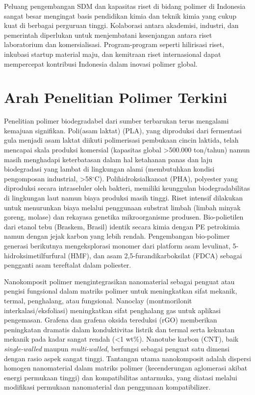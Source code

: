 \documentclass[12pt,a4paper,openany]{book}
\begin{document}
Peluang pengembangan SDM dan kapasitas riset di bidang polimer di Indonesia sangat besar mengingat basis pendidikan kimia dan teknik kimia yang cukup kuat di berbagai perguruan tinggi. Kolaborasi antara akademisi, industri, dan pemerintah diperlukan untuk menjembatani kesenjangan antara riset laboratorium dan komersialisasi. Program-program seperti hilirisasi riset, inkubasi startup material maju, dan kemitraan riset internasional dapat mempercepat kontribusi Indonesia dalam inovasi polimer global.

\section{Arah Penelitian Polimer Terkini}

Penelitian polimer biodegradabel dari sumber terbarukan terus mengalami kemajuan signifikan. Poli(asam laktat) (PLA), yang diproduksi dari fermentasi gula menjadi asam laktat diikuti polimerisasi pembukaan cincin laktida, telah mencapai skala produksi komersial (kapasitas global >500.000 ton/tahun) namun masih menghadapi keterbatasan dalam hal ketahanan panas dan laju biodegradasi yang lambat di lingkungan alami (membutuhkan kondisi pengomposan industrial, >58$^{\circ}$C). Polihidroksialkanoat (PHA), polyester yang diproduksi secara intraseluler oleh bakteri, memiliki keunggulan biodegradabilitas di lingkungan laut namun biaya produksi masih tinggi. Riset intensif dilakukan untuk menurunkan biaya melalui penggunaan substrat limbah (limbah minyak goreng, molase) dan rekayasa genetika mikroorganisme produsen. Bio-polietilen dari etanol tebu (Braskem, Brasil) identik secara kimia dengan PE petrokimia namun dengan jejak karbon yang lebih rendah. Pengembangan bio-polimer generasi berikutnya mengeksplorasi monomer dari platform asam levulinat, 5-hidroksimetilfurfural (HMF), dan asam 2,5-furandikarboksilat (FDCA) sebagai pengganti asam tereftalat dalam poliester.

Nanokomposit polimer mengintegrasikan nanomaterial sebagai penguat atau pengisi fungsional dalam matriks polimer untuk meningkatkan sifat mekanik, termal, penghalang, atau fungsional. Nanoclay (montmorilonit interkalasi/eksfoliasi) meningkatkan sifat penghalang gas untuk aplikasi pengemasan. Grafena dan grafena oksida tereduksi (rGO) memberikan peningkatan dramatis dalam konduktivitas listrik dan termal serta kekuatan mekanik pada kadar sangat rendah (<1 wt\%). Nanotube karbon (CNT), baik \textit{single-walled} maupun \textit{multi-walled}, berfungsi sebagai penguat satu dimensi dengan rasio aspek sangat tinggi. Tantangan utama nanokomposit adalah dispersi homogen nanomaterial dalam matriks polimer (kecenderungan aglomerasi akibat energi permukaan tinggi) dan kompatibilitas antarmuka, yang diatasi melalui modifikasi permukaan nanomaterial dan penggunaan kompatibilizer.
\end{document}

